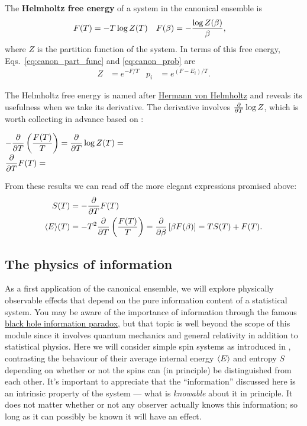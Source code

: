 \begin{shaded}
  The \textbf{Helmholtz free energy} of a system in the canonical ensemble is
  \begin{align}
    \label{eq:helmholtz}
    F(T) & = -T \log Z(T) &
    F(\beta) & = -\frac{\log Z(\beta)}{\beta},
  \end{align}
  where $Z$ is the partition function of the system.
  In terms of this free energy, Eqs.~\ref{eq:canon_part_func} and \ref{eq:canon_prob} are
  \begin{align*}
    Z & = e^{-F / T} &
    p_i & = e^{(F - E_i) / T}.
  \end{align*}
\end{shaded}

\newpage %
The Helmholtz free energy is named after \href{https://en.wikipedia.org/wiki/Hermann_von_Helmholtz}{Hermann von Helmholtz} and reveals its usefulness when we take its derivative.
The derivative involves $\frac{\partial }{\partial T} \log Z$, which is worth collecting in advance based on :
\begin{mdframed}
  $\displaystyle -\frac{\partial }{\partial T}\left(\frac{F(T)}{T}\right) = \frac{\partial }{\partial T} \log Z(T) = $ \\[50 pt]
  $\displaystyle \frac{\partial }{\partial T} F(T) = $ \\[50 pt]
\end{mdframed}
From these results we can read off the more elegant expressions promised above:
\begin{align}
  S(T) & = -\frac{\partial }{\partial T} F(T) \label{eq:canon_entropy-F} \\
  \left\langle E \right\rangle\!(T) & = -T^2 \frac{\partial }{\partial T}\left(\frac{F(T)}{T}\right) = \frac{\partial }{\partial \beta}\left[\beta F(\beta)\right] = T S(T) + F(T). \label{eq:canon_energy-F}
\end{align}



\subsection{\label{sec:spin_info}The physics of information}
As a first application of the canonical ensemble, we will explore physically observable effects that depend on the pure information content of a statistical system.
You may be aware of the importance of information through the famous \href{https://en.wikipedia.org/wiki/Black_hole_information_paradox}{black hole information paradox}, but that topic is well beyond the scope of this module since it involves quantum mechanics and general relativity in addition to statistical physics.
Here we will consider simple spin systems as introduced in , contrasting the behaviour of their average internal energy $\left\langle E \right\rangle$ and entropy $S$ depending on whether or not the spins can (in principle) be distinguished from each other.
It's important to appreciate that the ``information'' discussed here is an intrinsic property of the system --- what is \textit{knowable} about it in principle.
It does not matter whether or not any observer actually knows this information; so long as it can possibly be known it will have an effect.

